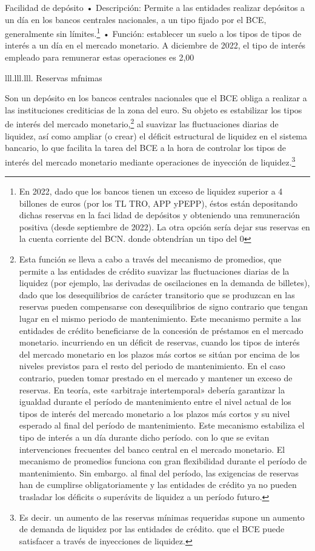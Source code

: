 \documentclass[10pt,a4paper]{article}
\begin{document}
{Facilidad de depósito
• Descripción: Permite a las entidades realizar depósitos a un día en los bancos centrales nacionales, a un tipo fijado por el BCE, generalmente sin límites.\footnote{%
    En 2022, dado que los bancos tienen un exceso de liquidez superior a 4 billones de euros (por los TL TRO, APP yPEPP), éstos están depositando dichas reservas en la faci lidad de depósitos y obteniendo una remuneración positiva (desde septiembre de 2022). La otra opción sería dejar sus reservas en la cuenta corriente del BCN. donde obtendrían un tipo del 0%
}
• Función: establecer un suelo a los tipos de tipos de interés a un día en el mercado monetario. A diciembre de 2022, el tipo de interés empleado para remunerar estas operaciones es 2,00%

lll.lll.lll. Reservas mfnimas

Son un depósito en los bancos centrales nacionales que el BCE obliga a realizar a las instituciones crediticias de la zona del euro. Su objeto es estabilizar los tipos de interés del mercado monetario,\footnote{%
    Esta función se lleva a cabo a través del mecanismo de promedios, que permite a las entidades de crédito suavizar las fluctuaciones diarias de la liquidez (por ejemplo, las derivadas de oscilaciones en la demanda de billetes), dado que los desequilibrios de carácter transitorio que se produzcan en las reservas pueden compensarse con desequilibrios de signo contrario que tengan lugar en el mismo periodo de mantenimiento. Este mecanismo permite a las entidades de crédito beneficiarse de la concesión de préstamos en el mercado monetario. incurriendo en un déficit de reservas, cuando los tipos de interés del mercado monetario en los plazos más cortos se sitúan por encima de los niveles previstos para el resto del periodo de mantenimiento. En el caso contrario, pueden tomar prestado en el mercado y mantener un exceso de reservas. En teoría, este «arbitraje intertemporal» debería garantizar la igualdad durante el período de mantenimiento entre el nivel actual de los tipos de interés del mercado monetario a los plazos más cortos y su nivel esperado al final del período de mantenimiento. Este mecanismo estabiliza el tipo de interés a un día durante dicho período. con lo que se evitan intervenciones frecuentes del banco central en el mercado monetario. El mecanismo de promedios funciona con gran flexibilidad durante el período de mantenimiento. Sin embargo. al final del período, las exigencias de reservas han de cumplirse obligatoriamente y las entidades de crédito ya no pueden trasladar los déficits o superávits de liquidez a un período futuro.
} al suavizar las fluctuaciones diarias de liquidez, así como ampliar (o crear) el déficit estructural de liquidez en el sistema bancario, lo que facilita la tarea del BCE a la hora de controlar los tipos de interés del mercado monetario mediante operaciones de inyección de liquidez.\footnote{
Es decir. un aumento de las reservas mínimas requeridas supone un aumento de demanda de liquidez por las entidades de crédito. que el BCE puede satisfacer a través de inyecciones de liquidez.
}

}
\end{document}
